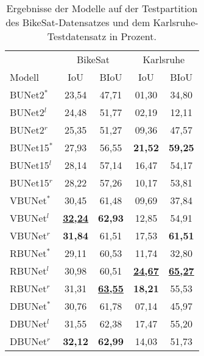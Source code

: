 \begin{table}[ht]
	\centering
	\begin{tabular}{l|cc|cc}
        & \multicolumn{2}{c|}{BikeSat} & \multicolumn{2}{c}{Karlsruhe} \\
		Modell & \ac{IoU} & \ac{BIoU} & \ac{IoU} & \ac{BIoU} \\
		\midrule
        BUNet2$^*$ & 23,54 & 47,71 & 01,30 & 34,80 \\ 
        BUNet2$^l$ & 24,48 & 51,77 & 02,19 & 12,11 \\ 
        BUNet2$^r$ & 25,35 & 51,27 & 09,36 & 47,57 \\ 
		\midrule

        BUNet15$^*$ & 27,93 & 56,55 & \textbf{21,52} & \textbf{59,25} \\ 
        BUNet15$^l$ & 28,14 & 57,14 & 16,47 & 54,17 \\ 
        BUNet15$^r$ & 28,22 & 57,26 & 10,17 & 53,81 \\ 
		\midrule

        VBUNet$^*$ & 30,45 & 61,48 & 09,69 & 37,84 \\ 
        VBUNet$^l$ & \underline{\textbf{32,24}} & \textbf{62,93} & 12,85 & 54,91 \\ 
        VBUNet$^r$ & \textbf{31,84} & 61,51 & 17,53 & \textbf{61,51} \\ 
		\midrule

        RBUNet$^*$ & 29,11 & 60,53 & 11,74 & 32,80 \\ 
        RBUNet$^l$ & 30,98 & 60,51 & \underline{\textbf{24,67}} & \underline{\textbf{65,27}} \\ 
        RBUNet$^r$ & 31,31 & \underline{\textbf{63,55}} & \textbf{18,21} & 55,53 \\ 
		\midrule

        DBUNet$^*$ & 30,76 & 61,78 & 07,14 & 45,97 \\ 
        DBUNet$^l$ & 31,55 & 62,38 & 17,47 & 55,20 \\ 
        DBUNet$^r$ & \textbf{32,12} & \textbf{62,99} & 14,03 & 51,73 \\ 
        
	\end{tabular}
	\caption{Ergebnisse der Modelle auf der Testpartition des BikeSat-Datensatzes und dem Karlsruhe-Testdatensatz 
    in Prozent.}
	\label{tab:results}
\end{table}


